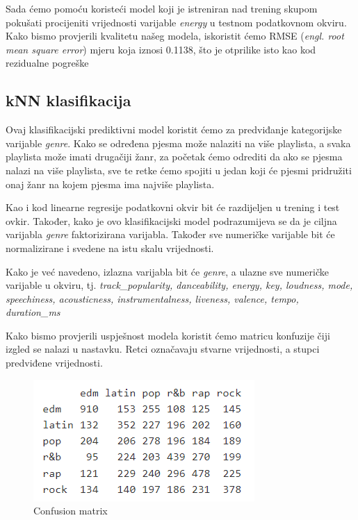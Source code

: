 	Sada ćemo pomoću koristeći model koji je istreniran nad trening skupom pokušati procijeniti vrijednosti varijable \textit{energy} u testnom podatkovnom okviru. Kako bismo provjerili kvalitetu našeg modela, iskoristit ćemo RMSE (\textit{engl. root mean square error}) mjeru koja iznosi 0.1138, što je otprilike isto kao kod rezidualne pogreške
	
	\subsection{kNN klasifikacija}
	
	Ovaj klasifikacijski prediktivni model koristit ćemo za predviđanje kategorijske varijable \textit{genre}. Kako se određena pjesma može nalaziti na više playlista, a svaka playlista može imati drugačiji žanr, za početak ćemo odrediti da ako se pjesma nalazi na više playlista, sve te retke ćemo spojiti u jedan koji će pjesmi pridružiti onaj žanr na kojem pjesma ima najviše playlista. 
	
	Kao i kod linearne regresije podatkovni okvir bit će razdijeljen u trening i test ovkir. Također, kako je ovo klasifikacijski model podrazumijeva se da je ciljna varijabla \textit{genre} faktorizirana varijabla. Također sve numeričke varijable bit će normalizirane i svedene na istu skalu vrijednosti. 
	
	Kako je već navedeno, izlazna varijabla bit će \textit{genre}, a ulazne sve numeričke varijable u okviru, tj. \textit{track\_popularity, danceability, energy, key, loudness, mode, speechiness, acousticness, instrumentalness, liveness, valence, tempo, duration\_ms}
	
	Kako bismo provjerili uspješnost modela koristit ćemo matricu konfuzije čiji izgled se nalazi u nastavku. Retci označavaju stvarne vrijednosti, a stupci predviđene vrijednosti.
	
	\begin{figure}[H]
		\includegraphics[scale=0.9]{slike/confMatrix.png}
		\centering
		\caption{Confusion matrix}
		
	\end{figure}
	
